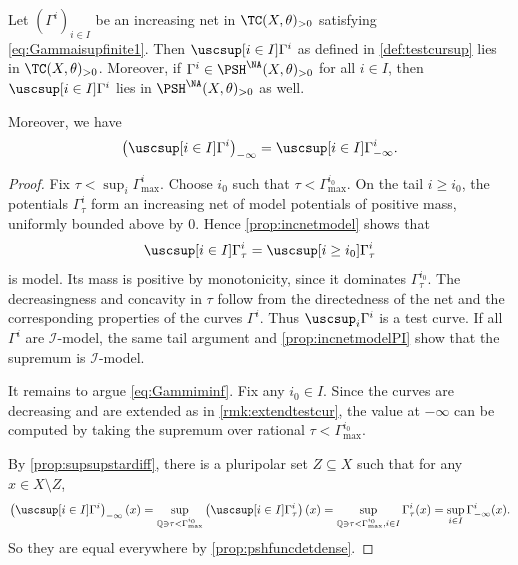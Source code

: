 \begin{proposition}\label{prop:supsincnetteestcur}
    Let $(\Gamma^i)_{i\in I}$ be an increasing net in $\TC(X,\theta)_{>0}$ satisfying \eqref{eq:Gammaisupfinite1}. Then $\uscsup[i\in I] \Gamma^{i}$ as defined in \cref{def:testcursup} lies in $\TC(X,\theta)_{>0}$. Moreover, if $\Gamma^i\in \PSH^{\NA}(X,\theta)_{>0}$ for all $i\in I$, then $\uscsup[i\in I] \Gamma^{i}$ lies in $\PSH^{\NA}(X,\theta)_{>0}$ as well.

    Moreover, we have
    \begin{equation}\label{eq:Gammiminf}
        \left( \uscsup[i\in I] \Gamma^{i} \right)_{-\infty}=\uscsup[i\in I]\Gamma^i_{-\infty}.
    \end{equation}
\end{proposition}
\begin{proof}
    Fix $\tau<\sup_i\Gamma^i_{\max}$. Choose $i_0$ such that $\tau<\Gamma^{i_0}_{\max}$. On the tail $i\geq i_0$, the potentials $\Gamma^i_\tau$ form an increasing net of model potentials of positive mass, uniformly bounded above by $0$. Hence \cref{prop:incnetmodel} shows that
    \[
        \uscsup[i\in I]\Gamma^i_\tau = \uscsup[i\geq i_0]\Gamma^i_\tau
    \]
    is model. Its mass is positive by monotonicity, since it dominates $\Gamma^{i_0}_\tau$. The decreasingness and concavity in $\tau$ follow from the directedness of the net and the corresponding properties of the curves $\Gamma^i$. Thus $\uscsup_i\Gamma^i$ is a test curve. If all $\Gamma^i$ are $\mathcal I$-model, the same tail argument and \cref{prop:incnetmodelPI} show that the supremum is $\mathcal I$-model.

    It remains to argue \eqref{eq:Gammiminf}. Fix any $i_0\in I$. Since the curves are decreasing and are extended as in \cref{rmk:extendtestcur}, the value at $-\infty$ can be computed by taking the supremum over rational $\tau<\Gamma^{i_0}_{\max}$.

    By \cref{prop:supsupstardiff}, there is a pluripolar set $Z\subseteq X$ such that for any $x\in X\setminus Z$,
    \[
    \left( \uscsup[i\in I] \Gamma^{i} \right)_{-\infty}(x)=\sup_{\mathbb{Q}\ni \tau< \Gamma^{i_0}_{\max}}\left(\uscsup[i\in I]\Gamma^i_{\tau}\right)(x)=\sup_{\mathbb{Q}\ni \tau< \Gamma^{i_0}_{\max},i\in I}\Gamma^i_{\tau}(x)=\sup_{i\in I}\Gamma^i_{-\infty}(x).
    \]
    So they are equal everywhere by \cref{prop:pshfuncdetdense}.
\end{proof}

